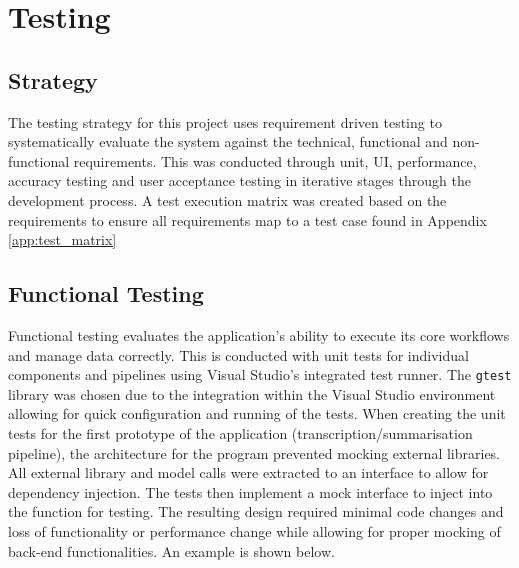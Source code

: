 \chapter{Testing}

\section{Strategy}
The testing strategy for this project uses requirement driven testing to systematically evaluate the system against the technical, functional and non-functional requirements. This was conducted through unit, UI, performance, accuracy testing and user acceptance testing in iterative stages through the development process. A test execution matrix was created based on the requirements to ensure all requirements map to a test case found in Appendix \ref{app:test_matrix}

\section{Functional Testing}
Functional testing evaluates the application's ability to execute its core workflows and manage data correctly. This is conducted with unit tests for individual components and pipelines using Visual Studio's integrated test runner. The \texttt{gtest} library was chosen due to the integration within the Visual Studio environment allowing for quick configuration and running of the tests. When creating the unit tests for the first prototype of the application (transcription/summarisation pipeline), the architecture for the program prevented mocking external libraries. All external library and model calls were extracted to an interface to allow for dependency injection. The tests then implement a mock interface to inject into the function for testing. The resulting design required minimal code changes and loss of functionality or performance change while allowing for proper mocking of back-end functionalities. An example is shown below.

